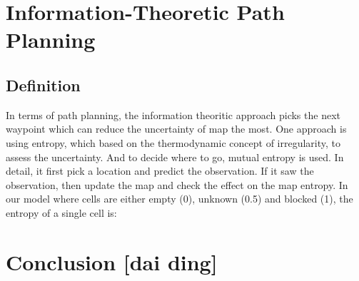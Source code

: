 \documentclass{article}
\begin{document}
\section{Information-Theoretic Path Planning}

\subsection {Definition}
In terms of path planning, the information theoritic approach picks the next waypoint which can reduce the uncertainty of map the most. One approach is using entropy, which based on the thermodynamic concept of irregularity, to assess the uncertainty. And to decide where to go, mutual entropy is used. In detail, it first pick a location and predict the observation. If it saw the observation, then update the map and check the effect on the map entropy. In our model where cells are either empty (0), unknown (0.5) and blocked (1), the entropy of a single cell is:
\section{Conclusion [dai ding]}

  


\begin{thebibliography}{1}

\end{thebibliography}


\end{document}
